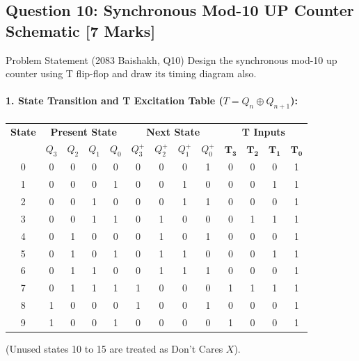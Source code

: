\documentclass[11pt,a4paper,oneside]{book}
\begin{document}
\subsection{Question 10: Synchronous Mod-10 UP Counter Schematic [7 Marks]}
\begin{questionbox}{Problem Statement (2083 Baishakh, Q10)}
Design the synchronous mod-10 up counter using T flip-flop and draw its timing diagram also.
\end{questionbox}

\paragraph{1. State Transition and T Excitation Table ($T = Q_n \oplus Q_{n+1}$):}
\begin{center}
\begin{tabular}{|c|cccc|cccc|cccc|}
\hline
\textbf{State} & \multicolumn{4}{c|}{\textbf{Present State}} & \multicolumn{4}{c|}{\textbf{Next State}} & \multicolumn{4}{c|}{\textbf{T Inputs}} \\
& $Q_3$ & $Q_2$ & $Q_1$ & $Q_0$ & $Q_3^+$ & $Q_2^+$ & $Q_1^+$ & $Q_0^+$ & $\mathbf{T_3}$ & $\mathbf{T_2}$ & $\mathbf{T_1}$ & $\mathbf{T_0}$ \\ \hline
0 & 0 & 0 & 0 & 0 & 0 & 0 & 0 & 1 & 0 & 0 & 0 & 1 \\ \hline
1 & 0 & 0 & 0 & 1 & 0 & 0 & 1 & 0 & 0 & 0 & 1 & 1 \\ \hline
2 & 0 & 0 & 1 & 0 & 0 & 0 & 1 & 1 & 0 & 0 & 0 & 1 \\ \hline
3 & 0 & 0 & 1 & 1 & 0 & 1 & 0 & 0 & 0 & 1 & 1 & 1 \\ \hline
4 & 0 & 1 & 0 & 0 & 0 & 1 & 0 & 1 & 0 & 0 & 0 & 1 \\ \hline
5 & 0 & 1 & 0 & 1 & 0 & 1 & 1 & 0 & 0 & 0 & 1 & 1 \\ \hline
6 & 0 & 1 & 1 & 0 & 0 & 1 & 1 & 1 & 0 & 0 & 0 & 1 \\ \hline
7 & 0 & 1 & 1 & 1 & 1 & 0 & 0 & 0 & 1 & 1 & 1 & 1 \\ \hline
8 & 1 & 0 & 0 & 0 & 1 & 0 & 0 & 1 & 0 & 0 & 0 & 1 \\ \hline
9 & 1 & 0 & 0 & 1 & 0 & 0 & 0 & 0 & 1 & 0 & 0 & 1 \\ \hline
\end{tabular}
\end{center}
(Unused states 10 to 15 are treated as Don't Cares $X$).
\end{document}

